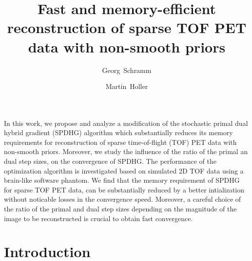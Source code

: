 \documentclass[11pt,twocolumn,twoside]{article}
\begin{document}
\title{Fast and memory-efficient reconstruction of sparse TOF PET data with non-smooth priors} 

\author[1]{Georg~Schramm}
\author[2]{Martin~Holler}



\maketitle
\thispagestyle{fancy}





\begin{customabstract}
In this work, we propose and analyze a modification of the stochastic primal dual hybrid gradient
(SPDHG) algorithm which substantially reduces its memory requirements 
for reconstruction of sparse time-of-flight (TOF) PET data with non-smooth priors.
Moreover, we study the influence of the ratio of the primal an dual step sizes, 
on the convergence of SPDHG.
The performance of the optimization algorithm is investigated based on simulated 2D TOF
data using a brain-like software phantom.
We find that the memory requirement of SPDHG for sparse TOF PET data, can be
substantially reduced by a better intialization without noticable losses in the convergence speed.
Moreover, a careful choice of the ratio of the primal and dual step sizes 
depending on the magnitude of the image to be reconstructed is crucial to obtain fast convergence.
\end{customabstract}


\section{Introduction}
\end{document}
